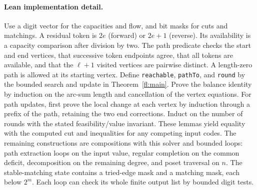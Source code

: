 \paragraph{Lean implementation detail.}
Use a digit vector for the capacities and flow, and bit masks for
cuts and matchings. A residual token is $2e$ (forward) or $2e+1$
(reverse). Its availability is a capacity comparison after division
by two. The path predicate checks the start and end vertices, that
successive token endpoints agree, that all tokens are available, and
that the $\ell+1$ visited vertices are pairwise distinct. A
length-zero path is allowed at its starting vertex. Define
\texttt{reachable}, \texttt{pathTo}, and \texttt{round} by the bounded
search and update in Theorem~\ref{fl:main}. Prove the balance identity
by induction on the arc-sum length and cancellation of the vertex
equations. For path updates, first prove the local change at each
vertex by induction through a prefix of the path, retaining the two
end corrections. Induct on the number of rounds with the stated
feasibility/value invariant. These lemmas yield equality with the
computed cut and inequalities for any competing input codes.
The remaining constructions are compositions with this solver and
bounded loops: path extraction loops on the input value, regular
completion on the common deficit, decomposition on the remaining
degree, and poset traversal on $n$. The stable-matching state contains
a tried-edge mask and a matching mask, each below $2^m$.
Each loop can check its whole finite output list by bounded digit tests.
